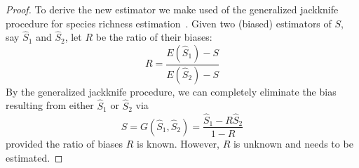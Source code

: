 \documentclass[conference]{IEEEtran}
\begin{document}
\begin{proof}
To derive the new estimator we make used of the generalized jackknife procedure for species richness estimation~\cite{heltshe1983estimating}. Given two (biased) estimators of $S$, say $\hat{S}_1$ and $\hat{S}_2$, let $R$ be the ratio of their biases:
\begin{equation}
R = \frac{E(\hat{S}_1) - S}{E(\hat{S}_2) - S}
\end{equation}
By the generalized jackknife procedure, we can completely eliminate the bias resulting from either $\hat{S}_1$ or $\hat{S}_2$ via
\begin{equation}
S = G(\hat{S}_1, \hat{S}_2) = \frac{\hat{S}_1 - R\hat{S}_2}{1 - R}
\label{eq:jknife}
\end{equation}
provided the ratio of biases $R$ is known. However, $R$ is unknown and needs to be estimated. 


\end{proof}
\end{document}
